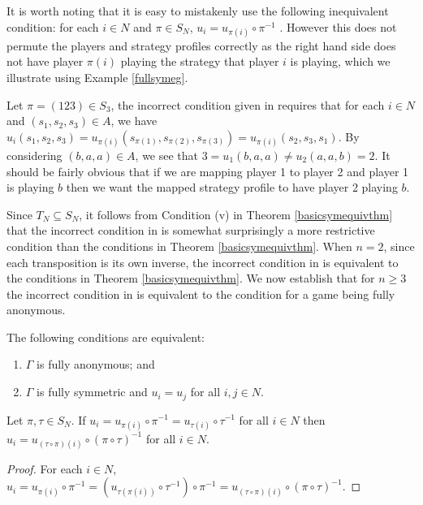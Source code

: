 It is worth noting that it is easy to mistakenly use the following inequivalent condition: for each $i \in N$ and $\pi \in S_N$, $u_i = u_{\pi(i)} \circ \pi^{-1}$ \cite[Definition 7]{DMaskin}. However this does not permute the players and strategy profiles correctly as the right hand side does not have player $\pi(i)$ playing the strategy that player $i$ is playing, which we illustrate using Example \ref{fullsymeg}. 

Let $\pi = (123) \in S_3$, the incorrect condition given in \cite[Definition 7]{DMaskin} requires that for each $i \in N$ and $(s_1, s_2, s_3) \in A$, we have $u_i(s_1, s_2, s_3) = u_{\pi(i)}(s_{\pi(1)}, s_{\pi(2)}, s_{\pi(3)}) = u_{\pi(i)}(s_2, s_3, s_1)$. By considering $(b, a, a) \in A$, we see that $3 = u_1(b, a, a) \neq u_2(a, a, b) = 2$. It should be fairly obvious that if we are mapping player 1 to player 2 and player 1 is playing $b$ then we want the mapped strategy profile to have player 2 playing $b$.

Since $T_N \subseteq S_N$, it follows from Condition (v) in Theorem \ref{basicsymequivthm} that the incorrect condition in \cite[Definition 7]{DMaskin} is somewhat surprisingly a more restrictive condition than the conditions in Theorem \ref{basicsymequivthm}. When $n=2$, since each transposition is its own inverse, the incorrect condition in \cite[Definition 7]{DMaskin} is equivalent to the conditions in Theorem \ref{basicsymequivthm}. We now establish that for $n \geq 3$ the incorrect condition in \cite[Definition 7]{DMaskin} is equivalent to the condition for a game being fully anonymous. 

\begin{lemma} \label{brandtlemma}
	\cite{brandt2009symmetries} The following conditions are equivalent:
	\begin{enumerate}
		\item $\Gamma$ is fully anonymous; and
		\item $\Gamma$ is fully symmetric and $u_i = u_j$ for all $i, j \in N$.
	\end{enumerate}
\end{lemma}

\begin{lemma} \label{DMlemma}
	Let $\pi, \tau \in S_N$. If $u_i = u_{\pi(i)} \circ \pi^{-1} = u_{\tau(i)} \circ \tau^{-1}$ for all $i \in N$ then $u_i = u_{(\tau \circ \pi)(i)} \circ (\pi \circ \tau)^{-1}$ for all $i \in N$.
	\begin{proof}
		For each $i \in N$, $u_i = u_{\pi(i)} \circ \pi^{-1} = (u_{\tau(\pi(i))} \circ \tau^{-1}) \circ \pi^{-1} = u_{(\tau \circ \pi)(i)} \circ (\pi \circ \tau)^{-1}$.
	\end{proof}
\end{lemma}

